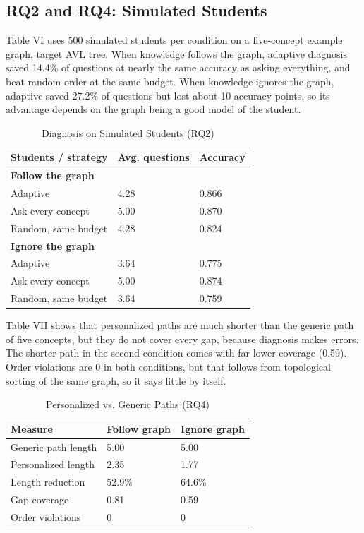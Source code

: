 \documentclass[conference]{IEEEtran}
\begin{document}
\subsection{RQ2 and RQ4: Simulated Students}
Table VI uses 500 simulated students per condition on a five-concept example graph, target AVL tree. When knowledge follows the graph, adaptive diagnosis saved 14.4\% of questions at nearly the same accuracy as asking everything, and beat random order at the same budget. When knowledge ignores the graph, adaptive saved 27.2\% of questions but lost about 10 accuracy points, so its advantage depends on the graph being a good model of the student.

\begin{table}[!t]
\caption{Diagnosis on Simulated Students (RQ2)}
\centering\footnotesize
\begin{tabular}{@{}p{}p{}p{}@{}}
\toprule
\textbf{Students / strategy} & \textbf{Avg. questions} & \textbf{Accuracy} \\ \midrule
\textbf{Follow the graph} &  &  \\
Adaptive & 4.28 & 0.866 \\
Ask every concept & 5.00 & 0.870 \\
Random, same budget & 4.28 & 0.824 \\
\textbf{Ignore the graph} &  &  \\
Adaptive & 3.64 & 0.775 \\
Ask every concept & 5.00 & 0.874 \\
Random, same budget & 3.64 & 0.759 \\
\bottomrule
\end{tabular}
\end{table}
Table VII shows that personalized paths are much shorter than the generic path of five concepts, but they do not cover every gap, because diagnosis makes errors. The shorter path in the second condition comes with far lower coverage (0.59). Order violations are 0 in both conditions, but that follows from topological sorting of the same graph, so it says little by itself.

\begin{table}[!t]
\caption{Personalized vs. Generic Paths (RQ4)}
\centering\footnotesize
\begin{tabular}{@{}p{}p{}p{}@{}}
\toprule
\textbf{Measure} & \textbf{Follow graph} & \textbf{Ignore graph} \\ \midrule
Generic path length & 5.00 & 5.00 \\
Personalized length & 2.35 & 1.77 \\
Length reduction & 52.9\% & 64.6\% \\
Gap coverage & 0.81 & 0.59 \\
Order violations & 0 & 0 \\
\bottomrule
\end{tabular}
\end{table}
\end{document}
